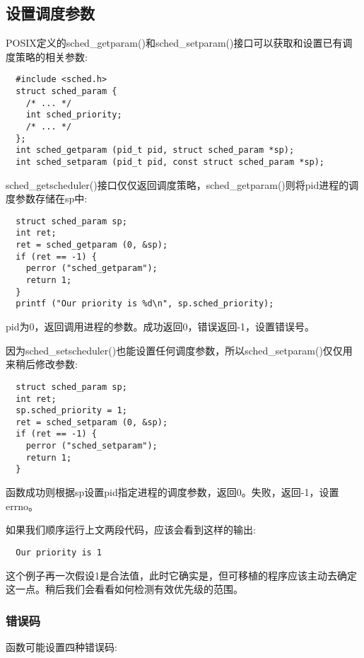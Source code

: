 \subsection{设置调度参数}

  POSIX定义的sched\_getparam()和sched\_setparam()接口可以获取和设置已有调度策略的相关参数:

\begin{lstlisting}
  #include <sched.h>
  struct sched_param {
    /* ... */
    int sched_priority;
    /* ... */
  };
  int sched_getparam (pid_t pid, struct sched_param *sp);
  int sched_setparam (pid_t pid, const struct sched_param *sp);
\end{lstlisting}

  sched\_getscheduler()接口仅仅返回调度策略，sched\_getparam()则将pid进程的调度参数存储在sp中:

\begin{lstlisting}
  struct sched_param sp;
  int ret;
  ret = sched_getparam (0, &sp);
  if (ret == -1) {
    perror ("sched_getparam");
    return 1;
  }
  printf ("Our priority is %d\n", sp.sched_priority);
\end{lstlisting}

  pid为0，返回调用进程的参数。成功返回0，错误返回-1，设置错误号。

  因为sched\_setscheduler()也能设置任何调度参数，所以sched\_setparam()仅仅用来稍后修改参数:

\begin{lstlisting}
  struct sched_param sp;
  int ret;
  sp.sched_priority = 1;
  ret = sched_setparam (0, &sp);
  if (ret == -1) {
    perror ("sched_setparam");
    return 1;
  }
\end{lstlisting}

  函数成功则根据sp设置pid指定进程的调度参数，返回0。失败，返回-1，设置errno。

  如果我们顺序运行上文两段代码，应该会看到这样的输出:

\begin{verbatim}
  Our priority is 1
\end{verbatim}

  这个例子再一次假设1是合法值，此时它确实是，但可移植的程序应该主动去确定这一点。稍后我们会看看如何检测有效优先级的范围。

\subsubsection{错误码}

  函数可能设置四种错误码:

